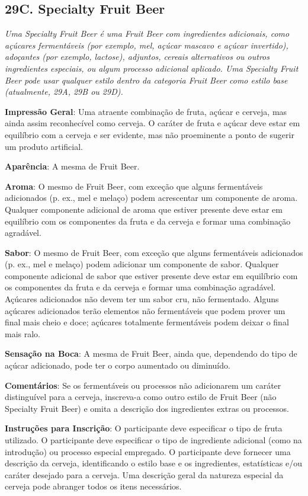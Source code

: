 \subsection*{29C. Specialty Fruit Beer}
\textit{Uma Specialty Fruit Beer é uma Fruit Beer com ingredientes adicionais, como açúcares fermentáveis (por exemplo, mel, açúcar mascavo e açúcar invertido), adoçantes (por exemplo, lactose), adjuntos, cereais alternativos ou outros ingredientes especiais, ou algum processo adicional aplicado. Uma Specialty Fruit Beer pode usar qualquer estilo dentro da categoria Fruit Beer como estilo base (atualmente, 29A, 29B ou 29D).}

\textbf{Impressão Geral}: Uma atraente combinação de fruta, açúcar e cerveja, mas ainda assim reconhecível como cerveja. O caráter de fruta e açúcar deve estar em equilíbrio com a cerveja e ser evidente, mas não proeminente a ponto de sugerir um produto artificial.

\textbf{Aparência}: A mesma de Fruit Beer.

\textbf{Aroma}: O mesmo de Fruit Beer, com exceção que alguns fermentáveis adicionados (p. ex., mel e melaço) podem acrescentar um componente de aroma. Qualquer componente adicional de aroma que estiver presente deve estar em equilíbrio com os componentes da fruta e da cerveja e formar uma combinação agradável.

\textbf{Sabor}: O mesmo de Fruit Beer, com exceção que alguns fermentáveis adicionados (p. ex., mel e melaço) podem adicionar um componente de sabor. Qualquer componente adicional de sabor que estiver presente deve estar em equilíbrio com os componentes da fruta e da cerveja e formar uma combinação agradável. Açúcares adicionados não devem ter um sabor cru, não fermentado. Alguns açúcares adicionados terão elementos não fermentáveis que podem prover um final mais cheio e doce; açúcares totalmente fermentáveis podem deixar o final mais ralo.

\textbf{Sensação na Boca}: A mesma de Fruit Beer, ainda que, dependendo do tipo de açúcar adicionado, pode ter o corpo aumentado ou diminuído.

\textbf{Comentários}: Se os fermentáveis ou processos não adicionarem um caráter distinguível para a cerveja, inscreva-a como outro estilo de Fruit Beer (não Specialty Fruit Beer) e omita a descrição dos ingredientes extras ou processos.

\textbf{Instruções para Inscrição}: O participante deve especificar o tipo de fruta utilizado. O participante deve especificar o tipo de ingrediente adicional (como na introdução) ou processo especial empregado. O participante deve fornecer uma descrição da cerveja, identificando o estilo base e os ingredientes, estatísticas e/ou caráter desejado para a cerveja. Uma descrição geral da natureza especial da cerveja pode abranger todos os itens necessários.

